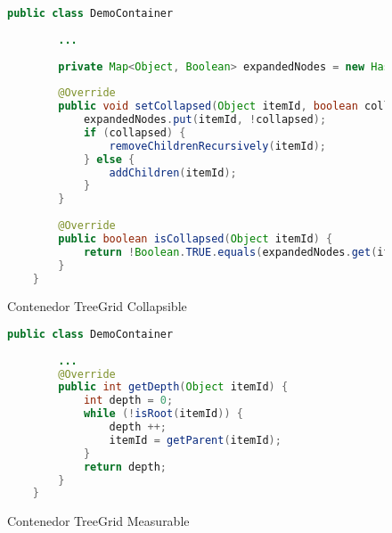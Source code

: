 \begin{figure}[!tb]
	\centering
	\begin{lstlisting}[language=Java]
	public class DemoContainer
	
		...
	
		private Map<Object, Boolean> expandedNodes = new HashMap<>();
			
		@Override
		public void setCollapsed(Object itemId, boolean collapsed) {
			expandedNodes.put(itemId, !collapsed);	
			if (collapsed) {
				removeChildrenRecursively(itemId);
			} else {
				addChildren(itemId);
			}
		}
		
		@Override
		public boolean isCollapsed(Object itemId) {
			return !Boolean.TRUE.equals(expandedNodes.get(itemId));
		}
	}
	\end{lstlisting}
	\caption{Contenedor TreeGrid Collapsible}
	\label{fig:demoContainerCollapsible}
\end{figure}

\begin{figure}[!tb]
	\centering
	\begin{lstlisting}[language=Java]	
	public class DemoContainer
	
		...
		@Override
		public int getDepth(Object itemId) {
			int depth = 0;
			while (!isRoot(itemId)) {
				depth ++;
				itemId = getParent(itemId);
			}
			return depth;
		}
	}
	\end{lstlisting}
	\caption{Contenedor TreeGrid Measurable}
	\label{fig:demoContainerMeasurable}
\end{figure}

